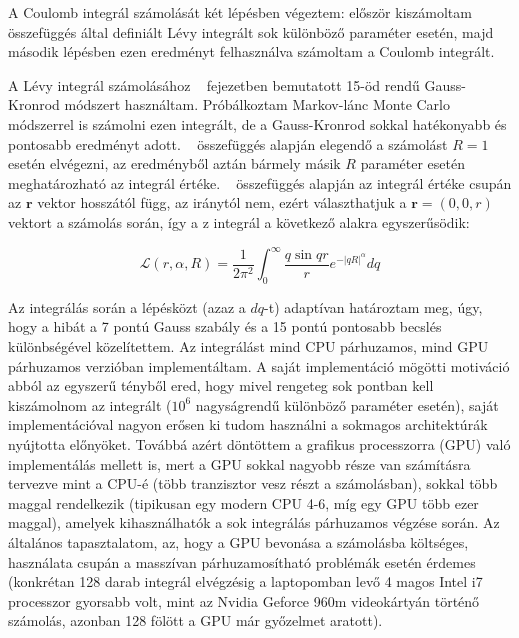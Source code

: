 \documentclass[11pt,a4paper]{article}
\numberwithin{equation}{subsection}
\numberwithin{figure}{section}
\begin{document}
A Coulomb integrál számolását két lépésben végeztem: először kiszámoltam ~ összefüggés által definiált Lévy integrált sok különböző paraméter esetén, majd második lépésben ezen eredményt felhasználva számoltam a Coulomb integrált.

A Lévy integrál számolásához ~ fejezetben bemutatott 15-öd rendű Gauss-Kronrod módszert használtam. Próbálkoztam Markov-lánc Monte Carlo módszerrel is számolni ezen integrált, de a Gauss-Kronrod sokkal hatékonyabb és pontosabb eredményt adott. ~ összefüggés alapján elegendő a számolást $R=1$ esetén elvégezni, az eredményből aztán bármely másik $R$ paraméter esetén meghatározható az integrál értéke. ~ összefüggés alapján az integrál értéke csupán az $\bm{r}$ vektor hosszától függ, az iránytól nem, ezért választhatjuk a $\bm{r}=(0,0,r)$ vektort a számolás során, így a z integrál a következő alakra egyszerűsödik:

\begin{equation}
\mathcal{L}(r, \alpha, R) = \frac{1}{2\pi^2}\int_0^\infty \frac{q\sin{qr}}{r}e^{-|qR|^\alpha}dq
\end{equation}

Az integrálás során a lépésközt (azaz a $dq$-t) adaptívan határoztam meg, úgy, hogy a hibát a 7 pontú Gauss szabály és a 15 pontú pontosabb becslés különbségével közelítettem. Az integrálást mind CPU párhuzamos, mind GPU párhuzamos verzióban implementáltam. A saját implementáció mögötti motiváció abból az egyszerű tényből ered, hogy mivel rengeteg sok pontban kell kiszámolnom az integrált ($10^6$ nagyságrendű különböző paraméter esetén), saját implementációval nagyon erősen ki tudom használni a sokmagos architektúrák nyújtotta előnyöket. Továbbá azért döntöttem a grafikus processzorra (GPU) való implementálás mellett is, mert a GPU sokkal nagyobb része van számításra tervezve mint a CPU-é (több tranzisztor vesz részt a számolásban), sokkal több maggal rendelkezik (tipikusan egy modern CPU 4-6, míg egy GPU több ezer maggal), amelyek kihasználhatók a sok integrálás párhuzamos végzése során. Az általános tapasztalatom, az, hogy a GPU bevonása a számolásba költséges, használata csupán a masszívan párhuzamosítható problémák esetén érdemes (konkrétan 128 darab integrál elvégzésig a laptopomban levő 4 magos Intel i7 processzor gyorsabb volt, mint az Nvidia Geforce 960m videokártyán történő számolás, azonban 128 fölött a GPU már győzelmet aratott).
\end{document}

